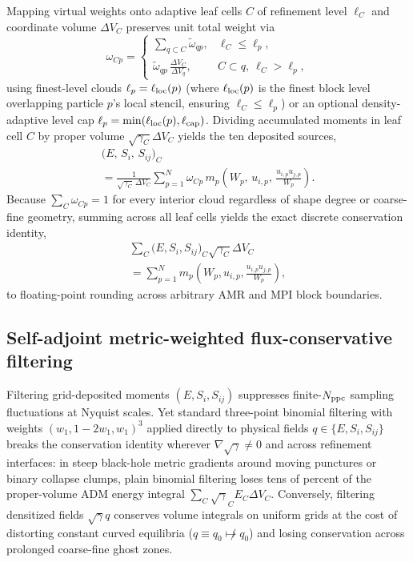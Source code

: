 Mapping virtual weights onto adaptive leaf cells $C$ of refinement level $\ell_C$ and coordinate volume $\Delta V_C$ preserves unit total weight via
\begin{equation}\label{eq:leaf_weights}
\omega_{Cp} =
\begin{cases}
\displaystyle \sum_{q \subset C} \tilde{\omega}_{qp}, & \ell_C \le \ell_p, \\[10pt]
\displaystyle \tilde{\omega}_{qp}\,\frac{\Delta V_C}{\Delta V_q}, & C \subset q,\ \ell_C > \ell_p,
\end{cases}
\end{equation}
using finest-level clouds $\ell_p = \ell_{\rm loc}(p)$ (where $\ell_{\rm loc}(p)$ is the finest block level overlapping particle $p$'s local stencil, ensuring $\ell_C \le \ell_p$) or an optional density-adaptive level cap $\ell_p = \min(\ell_{\rm loc}(p), \ell_{\rm cap})$. Dividing accumulated moments in leaf cell $C$ by proper volume $\sqrt{\gamma_C}\Delta V_C$ yields the ten deposited sources,
\begin{multline}\label{eq:deposited_sources}
\bigl(E,\, S_i,\, S_{ij}\bigr)_C \\
= \frac{1}{\sqrt{\gamma_C}\,\Delta V_C} \sum_{p=1}^{N} \omega_{Cp}\, m_p \left(W_p,\, u_{i,p},\, \frac{u_{i,p} u_{j,p}}{W_p}\right).
\end{multline}
Because $\sum_C \omega_{Cp} = 1$ for every interior cloud regardless of shape degree or coarse-fine geometry, summing across all leaf cells yields the exact discrete conservation identity,
\begin{multline}\label{eq:conservation_identity}
\sum_{C} \bigl(E, S_i, S_{ij}\bigr)_C \sqrt{\gamma_C}\Delta V_C \\
= \sum_{p=1}^{N} m_p \left(W_p, u_{i,p}, \frac{u_{i,p} u_{j,p}}{W_p}\right),
\end{multline}
to floating-point rounding across arbitrary AMR and MPI block boundaries.

\subsection{Self-adjoint metric-weighted flux-conservative filtering}\label{sec:method_filter}

Filtering grid-deposited moments $(E, S_i, S_{ij})$ suppresses finite-$N_{\rm ppc}$ sampling fluctuations at Nyquist scales. Yet standard three-point binomial filtering with weights $(w_1, 1 - 2w_1, w_1)^3$ applied directly to physical fields $q \in \{E, S_i, S_{ij}\}$ breaks the conservation identity wherever $\nabla\sqrt{\gamma} \ne 0$ and across refinement interfaces: in steep black-hole metric gradients around moving punctures or binary collapse clumps, plain binomial filtering loses tens of percent of the proper-volume ADM energy integral $\sum_C \sqrt{\gamma}_C E_C \Delta V_C$. Conversely, filtering densitized fields $\sqrt{\gamma} q$ conserves volume integrals on uniform grids at the cost of distorting constant curved equilibria ($q \equiv q_0 \not\mapsto q_0$) and losing conservation across prolonged coarse-fine ghost zones.


